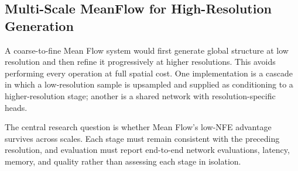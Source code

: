 \subsection{Multi-Scale MeanFlow for High-Resolution Generation}

A coarse-to-fine Mean Flow system would first generate global structure at low
resolution and then refine it progressively at higher resolutions. This avoids
performing every operation at full spatial cost. One implementation is a cascade
in which a low-resolution sample is upsampled and supplied as conditioning to a
higher-resolution stage; another is a shared network with resolution-specific
heads.

The central research question is whether Mean Flow's low-NFE advantage survives
across scales. Each stage must remain consistent with the preceding resolution,
and evaluation must report end-to-end network evaluations, latency, memory, and
quality rather than assessing each stage in isolation.
